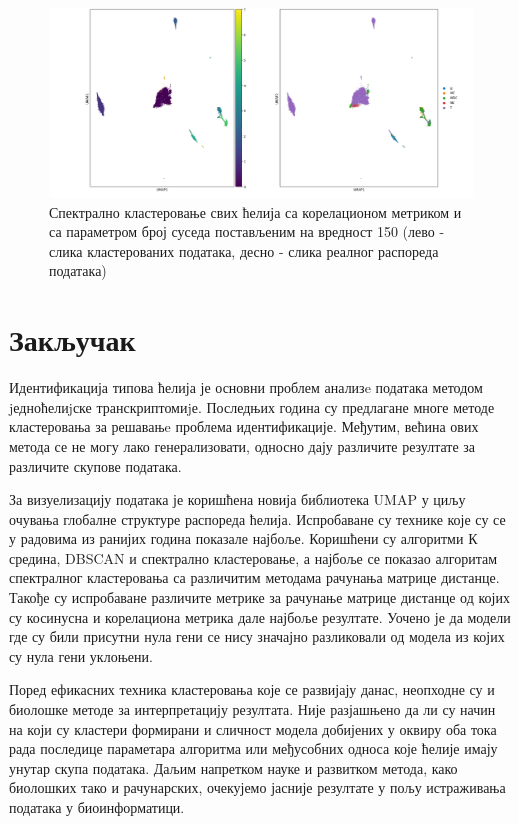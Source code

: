 \documentclass[10pt, a4paper]{article}
\begin{document}
\begin{figure}[H]
    \centering
    \captionsetup{justification=centering}
    \includegraphics[width=1.1\textwidth]{All_cells_correlation_150_8cls.png}
    \caption{Спектрално кластеровање свих ћелија са корелационом метриком и са параметром број суседа постављеним на вредност 150 (лево - слика кластерованих података, десно - слика реалног распореда података)}
    \label{fig:gustina2}
\end{figure}


\section{Закључак}
\label{sec: naslov5}

Идентификација типова ћелија је основни проблем анализe података методом jедноћелиjске транскриптомиjе. Последњих година су предлагане многе методе кластеровања за решавањe проблема идентификације. Међутим, већина ових метода се не могу лако генерализовати, односно дају различите резултате за различите скупове података.

За визуелизацију података је коришћена новија библиотека UMAP у циљу очувања глобалне структуре распореда ћелија. Испробаване су технике које су се у радовима из ранијих година показале најбоље. Коришћени су алгоритми К средина, DBSCAN и спектрално кластеровање, а најбоље се показао алгоритам спектралног кластеровања са различитим методама рачунања матрице дистанце. Такође су испробаване различите метрике за рачунање матрице дистанце од којих су косинусна и корелациона метрика дале најбоље резултате. Уочено је да модели где су били присутни нула гени се нису значајно разликовали од модела из којих су нула гени уклоњени.

Поред ефикасних техника кластеровања које се развијају данас, неопходне су и биолошке методе за интерпретацију резултата. Није разјашњено да ли су начин на који су кластери формирани и сличност модела добијених у оквиру оба тока рада последице параметара алгоритма или међусобних односа које ћелије имају унутар скупа података. Даљим напретком науке и развитком метода, како биолошких тако и рачунарских, очекујемо јасније резултате у пољу истраживања података у биоинформатици.

\break
\printbibliography[heading=bibnumbered]
\end{document}
